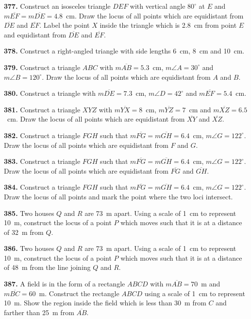 \documentclass[11pt]{article}
\begin{document}
\bigskip
\noindent\textbf{377.} Construct an isosceles triangle $DEF$ with vertical angle $80^{\circ}$ at $E$ and $m\overline{EF}=m\overline{DE}=4.8$~cm. Draw the locus of all points which are equidistant from $\overline{DE}$ and $\overline{EF}$. Label the point $X$ inside the triangle which is 2.8~cm from point $E$ and equidistant from $\overline{DE}$ and $\overline{EF}$.

\bigskip
\noindent\textbf{378.} Construct a right-angled triangle with side lengths 6~cm, 8~cm and 10~cm.

\bigskip
\noindent\textbf{379.} Construct a triangle $ABC$ with $m\overline{AB}=5.3$~cm, $m\angle A = 30^{\circ}$ and $m\angle B = 120^{\circ}$. Draw the locus of all points which are equidistant from $A$ and $B$.

\bigskip
\noindent\textbf{380.} Construct a triangle with $m\overline{DE}=7.3$~cm, $m\angle D = 42^{\circ}$ and $m\overline{EF}=5.4$~cm.

\bigskip
\noindent\textbf{381.} Construct a triangle $XYZ$ with $m\overline{YX}=8$~cm, $m\overline{YZ}=7$~cm and $m\overline{XZ}=6.5$~cm. Draw the locus of all points which are equidistant from $\overline{XY}$ and $\overline{XZ}$.

\bigskip
\noindent\textbf{382.} Construct a triangle $FGH$ such that $m\overline{FG}=m\overline{GH}=6.4$~cm, $m\angle G = 122^{\circ}$. Draw the locus of all points which are equidistant from $F$ and $G$.

\bigskip
\noindent\textbf{383.} Construct a triangle $FGH$ such that $m\overline{FG}=m\overline{GH}=6.4$~cm, $m\angle G = 122^{\circ}$. Draw the locus of all points which are equidistant from $\overline{FG}$ and $\overline{GH}$.

\bigskip
\noindent\textbf{384.} Construct a triangle $FGH$ such that $m\overline{FG}=m\overline{GH}=6.4$~cm, $m\angle G = 122^{\circ}$. Draw the locus of all points and mark the point where the two loci intersect.

\bigskip
\noindent\textbf{385.} Two houses $Q$ and $R$ are 73~m apart. Using a scale of 1~cm to represent 10~m, construct the locus of a point $P$ which moves such that it is at a distance of 32~m from $Q$.

\bigskip
\noindent\textbf{386.} Two houses $Q$ and $R$ are 73~m apart. Using a scale of 1~cm to represent 10~m, construct the locus of a point $P$ which moves such that it is at a distance of 48~m from the line joining $Q$ and $R$.

\bigskip
\noindent\textbf{387.} A field is in the form of a rectangle $ABCD$ with $m\overline{AB}=70$~m and $m\overline{BC}=60$~m. Construct the rectangle $ABCD$ using a scale of 1~cm to represent 10~m. Show the region inside the field which is less than 30~m from $C$ and farther than 25~m from $\overline{AB}$.
\end{document}
